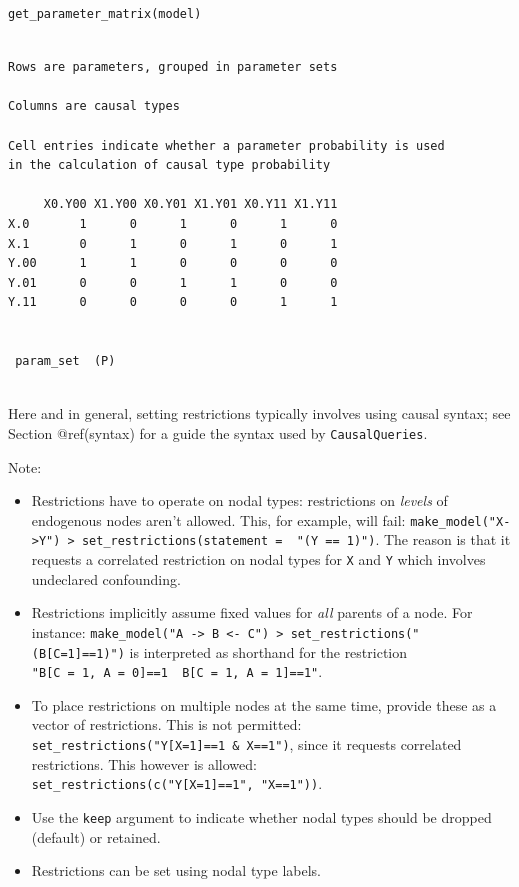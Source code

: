 \documentclass[
  article]{jss}
\providecommand{\tightlist}{%
  \setlength{\itemsep}{0pt}\setlength{\parskip}{0pt}}\usepackage{longtable,booktabs,array}
\begin{document}
\begin{verbatim}
get_parameter_matrix(model)
\end{verbatim}

\begin{verbatim}

Rows are parameters, grouped in parameter sets

Columns are causal types

Cell entries indicate whether a parameter probability is used
in the calculation of causal type probability

     X0.Y00 X1.Y00 X0.Y01 X1.Y01 X0.Y11 X1.Y11
X.0       1      0      1      0      1      0
X.1       0      1      0      1      0      1
Y.00      1      1      0      0      0      0
Y.01      0      0      1      1      0      0
Y.11      0      0      0      0      1      1

 
 param_set  (P)
 
\end{verbatim}

Here and in general, setting restrictions typically involves using
causal syntax; see Section @ref(syntax) for a guide the syntax used by
\texttt{CausalQueries}.

Note:

\begin{itemize}
\tightlist
\item
  Restrictions have to operate on nodal types: restrictions on
  \emph{levels} of endogenous nodes aren't allowed. This, for example,
  will fail:
  \texttt{make\_model("X-\textgreater{}Y")\ \textbar{}\textgreater{}\ set\_restrictions(statement\ =\ \ "(Y\ ==\ 1)")}.
  The reason is that it requests a correlated restriction on nodal types
  for \texttt{X} and \texttt{Y} which involves undeclared confounding.
\item
  Restrictions implicitly assume fixed values for \emph{all} parents of
  a node. For instance:
  \texttt{make\_model("A\ -\textgreater{}\ B\ \textless{}-\ C")\ \textbar{}\textgreater{}\ set\_restrictions("(B{[}C=1{]}==1)")}
  is interpreted as shorthand for the restriction
  \texttt{"B{[}C\ =\ 1,\ A\ =\ 0{]}==1\ \textbar{}\ B{[}C\ =\ 1,\ A\ =\ 1{]}==1"}.
\item
  To place restrictions on multiple nodes at the same time, provide
  these as a vector of restrictions. This is not permitted:
  \texttt{set\_restrictions("Y{[}X=1{]}==1\ \&\ X==1")}, since it
  requests correlated restrictions. This however is allowed:
  \texttt{set\_restrictions(c("Y{[}X=1{]}==1",\ "X==1"))}.\\
\item
  Use the \texttt{keep} argument to indicate whether nodal types should
  be dropped (default) or retained.
\item
  Restrictions can be set using nodal type labels.
\end{itemize}
\end{document}
